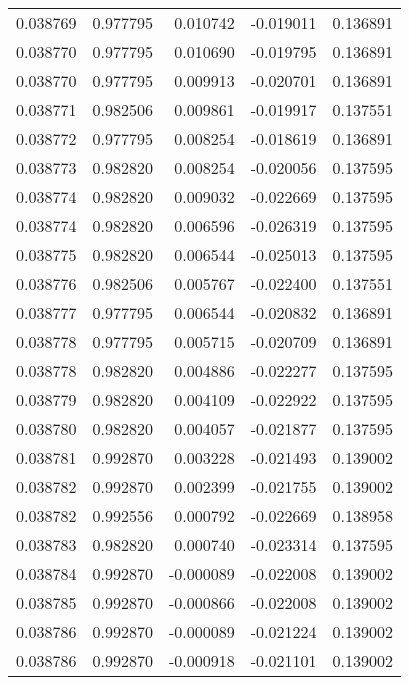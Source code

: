 \begin{tabular}{lrrrr}
0.038769    &  0.977795 &  0.010742 & -0.019011 &             0.136891 \\
0.038770    &  0.977795 &  0.010690 & -0.019795 &             0.136891 \\
0.038770    &  0.977795 &  0.009913 & -0.020701 &             0.136891 \\
0.038771    &  0.982506 &  0.009861 & -0.019917 &             0.137551 \\
0.038772    &  0.977795 &  0.008254 & -0.018619 &             0.136891 \\
0.038773    &  0.982820 &  0.008254 & -0.020056 &             0.137595 \\
0.038774    &  0.982820 &  0.009032 & -0.022669 &             0.137595 \\
0.038774    &  0.982820 &  0.006596 & -0.026319 &             0.137595 \\
0.038775    &  0.982820 &  0.006544 & -0.025013 &             0.137595 \\
0.038776    &  0.982506 &  0.005767 & -0.022400 &             0.137551 \\
0.038777    &  0.977795 &  0.006544 & -0.020832 &             0.136891 \\
0.038778    &  0.977795 &  0.005715 & -0.020709 &             0.136891 \\
0.038778    &  0.982820 &  0.004886 & -0.022277 &             0.137595 \\
0.038779    &  0.982820 &  0.004109 & -0.022922 &             0.137595 \\
0.038780    &  0.982820 &  0.004057 & -0.021877 &             0.137595 \\
0.038781    &  0.992870 &  0.003228 & -0.021493 &             0.139002 \\
0.038782    &  0.992870 &  0.002399 & -0.021755 &             0.139002 \\
0.038782    &  0.992556 &  0.000792 & -0.022669 &             0.138958 \\
0.038783    &  0.982820 &  0.000740 & -0.023314 &             0.137595 \\
0.038784    &  0.992870 & -0.000089 & -0.022008 &             0.139002 \\
0.038785    &  0.992870 & -0.000866 & -0.022008 &             0.139002 \\
0.038786    &  0.992870 & -0.000089 & -0.021224 &             0.139002 \\
0.038786    &  0.992870 & -0.000918 & -0.021101 &             0.139002 \\

\end{tabular}
